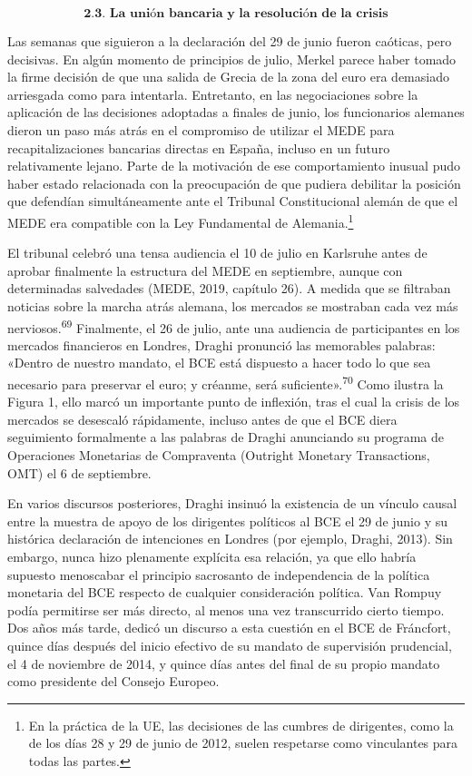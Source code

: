 \documentclass[10pt,a4paper]{article}
\begin{document}
{$$\textbf{2.3. La unión bancaria y la resolución de la crisis}$$

Las semanas que siguieron a la declaración del 29 de junio fueron caóticas, pero decisivas. En algún momento de principios de julio, Merkel parece haber tomado la firme decisión de que una salida de Grecia de la zona del euro era demasiado arriesgada como para intentarla. Entretanto, en las negociaciones sobre la aplicación de las decisiones adoptadas a finales de junio, los funcionarios alemanes dieron un paso más atrás en el compromiso de utilizar el MEDE para recapitalizaciones bancarias directas en España, incluso en un futuro relativamente lejano. Parte de la motivación de ese comportamiento inusual pudo haber estado relacionada con la preocupación de que pudiera debilitar la posición que defendían simultáneamente ante el Tribunal Constitucional alemán de que el MEDE era compatible con la Ley Fundamental de Alemania.\footnote{
En la práctica de la UE, las decisiones de las cumbres de dirigentes, como la de los días 28 y 29 de junio de 2012, suelen respetarse como vinculantes para todas las partes.
}

El tribunal celebró una tensa audiencia el 10 de julio en Karlsruhe antes de aprobar finalmente la estructura del MEDE en septiembre, aunque con determinadas salvedades (MEDE, 2019, capítulo 26). A medida que se filtraban noticias sobre la marcha atrás alemana, los mercados se mostraban cada vez más nerviosos.\textsuperscript{69} Finalmente, el 26 de julio, ante una audiencia de participantes en los mercados financieros en Londres, Draghi pronunció las memorables palabras: «Dentro de nuestro mandato, el BCE está dispuesto a hacer todo lo que sea necesario para preservar el euro; y créanme, será suficiente».\textsuperscript{70} Como ilustra la Figura 1, ello marcó un importante punto de inflexión, tras el cual la crisis de los mercados se desescaló rápidamente, incluso antes de que el BCE diera seguimiento formalmente a las palabras de Draghi anunciando su programa de Operaciones Monetarias de Compraventa (Outright Monetary Transactions, OMT) el 6 de septiembre.

En varios discursos posteriores, Draghi insinuó la existencia de un vínculo causal entre la muestra de apoyo de los dirigentes políticos al BCE el 29 de junio y su histórica declaración de intenciones en Londres (por ejemplo, Draghi, 2013). Sin embargo, nunca hizo plenamente explícita esa relación, ya que ello habría supuesto menoscabar el principio sacrosanto de independencia de la política monetaria del BCE respecto de cualquier consideración política. Van Rompuy podía permitirse ser más directo, al menos una vez transcurrido cierto tiempo. Dos años más tarde, dedicó un discurso a esta cuestión en el BCE de Fráncfort, quince días después del inicio efectivo de su mandato de supervisión prudencial, el 4 de noviembre de 2014, y quince días antes del final de su propio mandato como presidente del Consejo Europeo.

}
\end{document}
